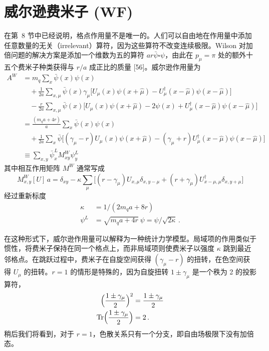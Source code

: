 \chapter{威尔逊费米子 (WF)}

在第~8 节中已经说明，格点作用量不是唯一的。人们可以自由地在作用量中添加任意数量的无关（irrelevant）算符，因为这些算符不改变连续极限。Wilson 对加倍问题的解决方案是添加一个维数为五的算符 $a r \bar\psi \square \psi$，由此在 $p_\mu = \pi$ 处的额外十五个费米子种类获得与 $r/a$ 成正比的质量 [56]。威尔逊作用量为
\begin{align}
A^W &= m_q \sum_x \bar\psi(x)\psi(x) \nonumber\\
&\quad + \frac{1}{2a}\sum_{x,\mu} \bar\psi(x)\gamma_\mu \bigl[ U_\mu(x)\psi(x+\hat{\mu}) - U_\mu^\dagger(x-\hat{\mu})\psi(x-\hat{\mu}) \bigr] \nonumber\\
&\quad - \frac{r}{2a}\sum_{x,\mu} \bar\psi(x) \bigl[ U_\mu(x)\psi(x+\hat{\mu}) - 2\psi(x) + U_\mu^\dagger(x-\hat{\mu})\psi(x-\hat{\mu}) \bigr] \nonumber\\
&= \frac{(m_q a + 4r)}{a}\sum_x \bar\psi(x)\psi(x) \nonumber\\
&\quad + \frac{1}{2a}\sum_x \bar\psi \bigl[ (\gamma_\mu - r) U_\mu(x)\psi(x+\hat{\mu}) - (\gamma_\mu + r) U_\mu^\dagger(x-\hat{\mu})\psi(x-\hat{\mu}) \bigr] \nonumber\\
&\equiv \sum_{x,y} \bar\psi^L_x M^W_{xy} \psi^L_y
\end{align}
其中相互作用矩阵 $M^W$ 通常写成
\begin{equation}
M^W_{x,y}[U]\,a = \delta_{xy} - \kappa \sum_\mu \bigl[ (r - \gamma_\mu) U_{x,\mu}\delta_{x,y-\mu} + (r + \gamma_\mu) U^\dagger_{x-\mu,\mu}\delta_{x,y+\mu} \bigr]
\end{equation}
经过重新标度
\begin{align}
\kappa &= 1/(2m_q a + 8r) \nonumber\\
\psi^L &= \sqrt{m_q a + 4r}\ \psi = \psi/\sqrt{2\kappa} \,.
\end{align}

在这种形式下，威尔逊作用量可以解释为一种统计力学模型。局域项的作用类似于惯性，将费米子保持在同一个格点上，而非局域项则使费米子以强度 $\kappa$ 跳到最近邻格点。在跳跃过程中，费米子在自旋空间获得 $(\gamma_\mu - r)$ 的扭转，在色空间获得 $U_\mu$ 的扭转。$r = 1$ 的情形是特殊的，因为自旋扭转 $1 \pm \gamma_\mu$ 是一个秩为 2 的投影算符，
\begin{align}
\Bigl( \frac{1 \pm \gamma_\mu}{2} \Bigr)^2 &= \frac{1 \pm \gamma_\mu}{2} \nonumber\\
\mathrm{Tr} \Bigl( \frac{1 \pm \gamma_\mu}{2} \Bigr) &= 2 \,.
\end{align}
稍后我们将看到，对于 $r = 1$，色散关系只有一个分支，即自由场极限下没有加倍态。

